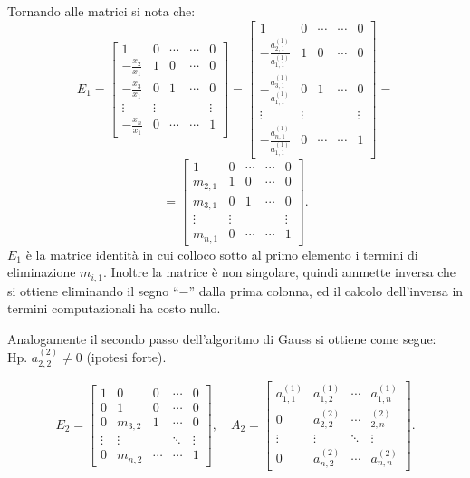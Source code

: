 \begin{osse}Tornando alle matrici si nota che:
\[
E_1 = \left[\begin{array}{ccccc}
1 & 0 &\cdots  &\cdots & 0 \\
-\frac{x_2}{x_1} & 1 & 0  & \cdots & 0 \\
-\frac{x_3}{x_1} & 0 & 1  & \cdots & 0 \\
\vdots & \vdots & & &\vdots \\
-\frac{x_n}{x_1} & 0 & \cdots &\cdots &1
\end{array}\right]
=
\left[\begin{array}{ccccc}
1 & 0 &\cdots  &\cdots & 0 \\
-\frac{a_{2,1}^{(1)}}{a_{1,1}^{(1)}} & 1 & 0  & \cdots & 0 \\
-\frac{a_{3,1}^{(1)}}{a_{1,1}^{(1)}} & 0 & 1  & \cdots & 0 \\
\vdots & \vdots & & &\vdots \\
-\frac{a_{n,1}^{(1)}}{a_{1,1}^{(1)}} & 0 & \cdots &\cdots &1
\end{array}\right]
=
\]
\[ =
\left[\begin{array}{ccccc}
1 & 0 &\cdots  &\cdots & 0 \\
m_{2,1} & 1 & 0  & \cdots & 0 \\
m_{3,1} & 0 & 1  & \cdots & 0 \\
\vdots & \vdots & & &\vdots \\
m_{n,1} & 0 & \cdots &\cdots &1
\end{array}\right].
\]
$E_1$ è la matrice identità in cui colloco sotto al primo elemento i termini
di eliminazione $m_{i,1}$. Inoltre la matrice è non singolare, quindi ammette
inversa che si ottiene eliminando il segno ``$-$'' dalla prima colonna, ed il
calcolo dell'inversa in termini computazionali ha costo nullo.
\end{osse}

Analogamente il secondo passo dell'algoritmo di Gauss si ottiene come segue:
\\Hp. $a_{2,2}^{(2)} \neq 0$ (ipotesi forte).

\[
E_2 =
\left[\begin{array}{ccccc}
1 & 0 & 0  &\cdots & 0 \\
0  & 1 & 0  & \cdots & 0 \\
0 & m_{3,2} & 1  & \cdots & 0 \\
\vdots & \vdots  & &\ddots & \vdots\\
0 & m_{n,2}  & \cdots &\cdots &1
\end{array}\right],
\quad
A_2 = \left[
\begin{array}{cccc}
a_{1,1}^{(1)} & a_{1,2}^{(1)} & \cdots & a_{1,n}^{(1)} \\
0 & a_{2,2}^{(2)} & \cdots & _{2,n}^{(2)} \\
\vdots & \vdots & \ddots & \vdots \\
0 & a_{n,2}^{(2)} & \cdots & a_{n,n}^{(2)}
\end{array} \right].
\]


